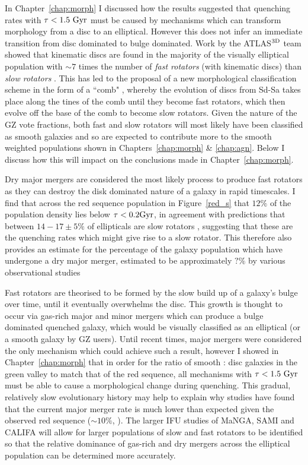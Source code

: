 In Chapter~\ref{chap:morph} I discussed how the results suggested that quenching rates with $\tau < 1.5~\rm{Gyr}$ must be caused by mechanisms which can transform morphology from a disc to an elliptical. However this does not infer an immediate transition from disc dominated to bulge dominated. Work by the \textsc{ATLAS}$^{\rm{3D}}$ team \citep{cappellari11} showed that kinematic discs are found in the majority of the visually elliptical population \citep{emsellem11} with $\sim7$ times the number of \emph{fast rotators} (with kinematic discs) than \emph{slow rotators} \citep[with dispersion dominated kinematics see][]{cappellari07, emsellem07}.  This has led to the proposal of a new morphological classification scheme in the form of a ``comb" \citep{refs}, whereby the evolution of discs from Sd-Sa takes place along the tines of the comb until they become fast rotators, which then evolve off the base of the comb to become slow rotators. Given the nature of the GZ vote fractions, both fast and slow rotators will most likely have been classified as smooth galaxies and so are expected to contribute more to the smooth weighted populations shown in Chapters~\ref{chap:morph} \& \ref{chap:agn}. Below I discuss how this will impact on the conclusions made in Chapter~\ref{chap:morph}. 

Dry major mergers are considered the most likely process to produce fast rotators \citep{duc11, naab14} as they can destroy the disk dominated nature of a galaxy \citep{toomre72} in rapid timescales. I find that across the red sequence population in Figure~\ref{red_s} that $12\%$ of the population density lies below $\tau <0.2 \rm{Gyr}$, in agreement with predictions that between $14-17\pm5\%$ of ellipticals are slow rotators \citep{emsellem11, stott16}, suggesting that these are the quenching rates which might give rise to a slow rotator. This therefore also provides an estimate for the percentage of the galaxy population which have undergone a dry major merger, estimated to be approximately $?\%$ by various observational studies \citep{ref bomb}

Fast rotators are theorised to be formed by the slow build up of a galaxy's bulge over time, until it eventually overwhelms the disc. This growth is thought to occur via gas-rich major and minor mergers \citep{duc11} which can produce a bulge dominated quenched galaxy, which would be visually classified as an elliptical (or a smooth galaxy by GZ users). Until recent times, major mergers were considered the only mechanism which could achieve such a result, however I showed in Chapter~\ref{chap:morph} that in order for the ratio of smooth : disc galaxies in the green valley to match that of the red sequence, all mechanisms with $\tau < 1.5 ~\rm{Gyr}$ must be able to cause a morphological change during quenching. This gradual, relatively slow evolutionary history may help to explain why studies have found that the current major merger rate is much lower than expected given the observed red sequence ($\sim 10\%$, \citealt{Lotz11}). The larger IFU studies of MaNGA, SAMI and CALIFA will allow for larger populations of slow and fast rotators to be identified so that the relative dominance of gas-rich and dry mergers across the elliptical population can be determined more accurately. 

